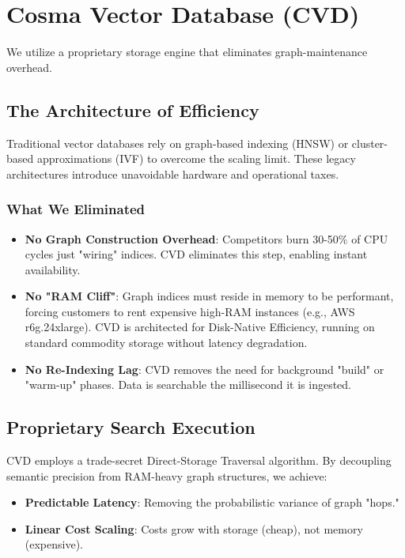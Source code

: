 \section{Cosma Vector Database (CVD)}

We utilize a proprietary storage engine that eliminates graph-maintenance overhead.

\subsection{The Architecture of Efficiency}

Traditional vector databases rely on graph-based indexing (HNSW) or cluster-based approximations (IVF) to overcome the scaling limit. These legacy architectures introduce unavoidable hardware and operational taxes.

\subsubsection*{What We Eliminated}

\begin{itemize}
    \item \textbf{No Graph Construction Overhead}: Competitors burn 30-50\% of CPU cycles just "wiring" indices. CVD eliminates this step, enabling instant availability.
    \item \textbf{No "RAM Cliff"}: Graph indices must reside in memory to be performant, forcing customers to rent expensive high-RAM instances (e.g., AWS r6g.24xlarge). CVD is architected for Disk-Native Efficiency, running on standard commodity storage without latency degradation.
    \item \textbf{No Re-Indexing Lag}: CVD removes the need for background "build" or "warm-up" phases. Data is searchable the millisecond it is ingested.
\end{itemize}

\subsection{Proprietary Search Execution}

CVD employs a trade-secret Direct-Storage Traversal algorithm. By decoupling semantic precision from RAM-heavy graph structures, we achieve:

\begin{itemize}
    \item \textbf{Predictable Latency}: Removing the probabilistic variance of graph "hops."
    \item \textbf{Linear Cost Scaling}: Costs grow with storage (cheap), not memory (expensive).
\end{itemize}

